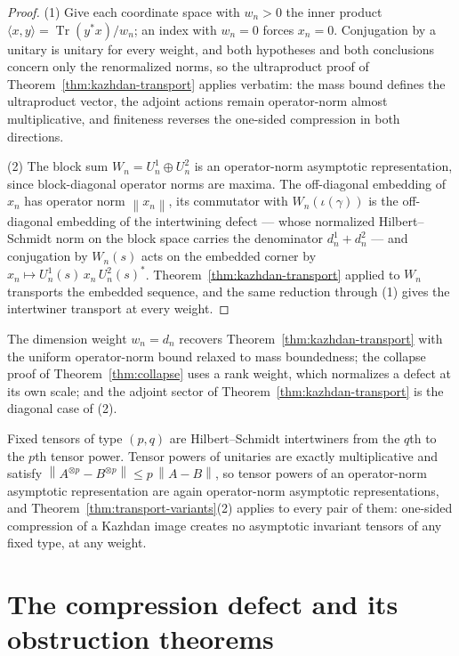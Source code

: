 \documentclass[11pt]{amsart}
\newcommand{\leanverified}[2]{\ignorespaces}
\theoremstyle{definition}
\theoremstyle{remark}
\theoremstyle{plain}
\newcommand{\opnorm}[1]{\left\lVert #1\right\rVert}
\begin{document}
\begin{proof}
(1)  Give each coordinate space with $w_n>0$ the inner product
$\langle x,y\rangle=\operatorname{Tr}(y^*x)/w_n$; an index with
$w_n=0$ forces $x_n=0$.  Conjugation by a unitary is unitary for every
weight, and both hypotheses and both conclusions concern only the
renormalized norms, so the ultraproduct proof of
Theorem~\ref{thm:kazhdan-transport} applies verbatim: the mass bound
defines the ultraproduct vector, the adjoint actions remain
operator-norm almost multiplicative, and finiteness reverses the
one-sided compression in both directions.

(2)  The block sum $W_n=U^1_n\oplus U^2_n$ is an operator-norm
asymptotic representation, since block-diagonal operator norms are
maxima.  The off-diagonal embedding of $x_n$ has operator norm
$\opnorm{x_n}$, its commutator with $W_n(\iota(\gamma))$ is the
off-diagonal embedding of the intertwining defect --- whose normalized
Hilbert--Schmidt norm on the block space carries the denominator
$d^1_n+d^2_n$ --- and conjugation by $W_n(s)$ acts on the embedded
corner by $x_n\mapsto U^1_n(s)\,x_n\,U^2_n(s)^*$.
Theorem~\ref{thm:kazhdan-transport} applied to $W_n$ transports the
embedded sequence, and the same reduction through (1) gives the
intertwiner transport at every weight.
\end{proof}

The dimension weight $w_n=d_n$ recovers
Theorem~\ref{thm:kazhdan-transport} with the uniform operator-norm
bound relaxed to mass boundedness; the collapse proof of
Theorem~\ref{thm:collapse} uses a rank weight, which normalizes a
defect at its own scale; and the adjoint sector of
Theorem~\ref{thm:kazhdan-transport} is the diagonal case of (2).

Fixed tensors of type $(p,q)$ are Hilbert--Schmidt intertwiners from the
$q$th to the $p$th tensor power.  Tensor powers of unitaries are exactly
multiplicative and satisfy
$\opnorm{A^{\otimes p}-B^{\otimes p}}\le p\,\opnorm{A-B}$, so tensor
powers of an operator-norm asymptotic representation are again
operator-norm asymptotic representations, and
Theorem~\ref{thm:transport-variants}(2) applies to every pair of them:
one-sided compression of a Kazhdan image creates no asymptotic invariant
tensors of any fixed type, at any weight.
\leanverified{Sofic/TensorPowerTransport}{GroupApproximation.TensorPowerTransport.manuscriptFixedTensorTransport}
\section{The compression defect and its obstruction theorems}\label{sec:conj}
\end{document}

